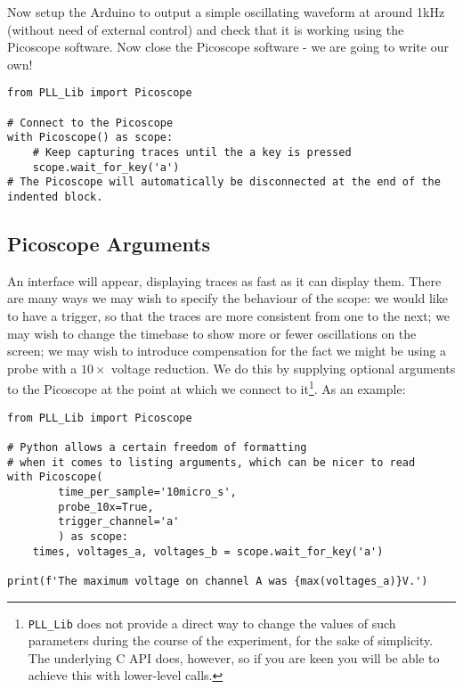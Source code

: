 \documentclass{article}
\begin{document}
Now setup the Arduino to output a simple oscillating waveform at around 1kHz (without need of external control) and check that it is working using the Picoscope software. Now close the Picoscope software - we are going to write our own!

\begin{verbatim}
from PLL_Lib import Picoscope

# Connect to the Picoscope
with Picoscope() as scope:
    # Keep capturing traces until the a key is pressed
    scope.wait_for_key('a')
# The Picoscope will automatically be disconnected at the end of the indented block.
\end{verbatim}

\subsection{Picoscope Arguments}
An interface will appear, displaying traces as fast as it can display them. There are many ways we may wish to specify the behaviour of the scope: we would like to have a trigger, so that the traces are more consistent from one to the next; we may wish to change the timebase to show more or fewer oscillations on the screen; we may wish to introduce compensation for the fact we might be using a probe with a $10\times$ voltage reduction. We do this by supplying optional arguments to the Picoscope at the point at which we connect to it\footnote{\texttt{PLL\_Lib} does not provide a direct way to change the values of such parameters during the course of the experiment, for the sake of simplicity. The underlying C API does, however, so if you are keen you will be able to achieve this with lower-level calls.}. As an example:

\begin{verbatim}
from PLL_Lib import Picoscope

# Python allows a certain freedom of formatting
# when it comes to listing arguments, which can be nicer to read
with Picoscope(
        time_per_sample='10micro_s',
        probe_10x=True,
        trigger_channel='a'
        ) as scope:
    times, voltages_a, voltages_b = scope.wait_for_key('a')
    
print(f'The maximum voltage on channel A was {max(voltages_a)}V.')
\end{verbatim}
\end{document}
